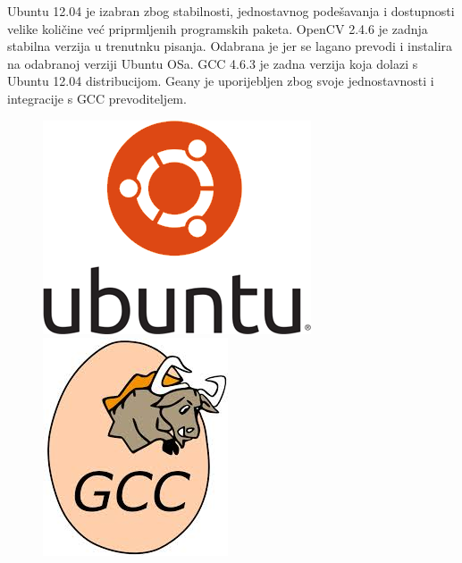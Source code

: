 Ubuntu 12.04 je izabran zbog stabilnosti, jednostavnog podešavanja i 
dostupnosti velike količine već priprmljenih programskih paketa.
OpenCV 2.4.6 je zadnja stabilna verzija u trenutnku pisanja. Odabrana
je jer se lagano prevodi i instalira na odabranoj verziji Ubuntu OSa.
GCC 4.6.3 je zadna verzija koja dolazi s Ubuntu 12.04 distribucijom.
Geany je uporijebljen zbog svoje jednostavnosti i integracije s GCC
prevoditeljem.
\\


\begin{figure}[!htb]
    \includegraphics[width=\linewidth]{figures/ubuntu.png}
\endminipage\hfill
{}
    \includegraphics[width=\linewidth]{figures/gcc.jpeg}

\end{figure}
